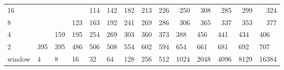 \begin{table}[h]
{\begin{tabular}{lrrrrrrrrrrrrr}
		\multicolumn{1}{|l|}{16} &  &  &  & \cellcolor[HTML]{99E600}114 & \cellcolor[HTML]{99E600}142 & \cellcolor[HTML]{99E600}182 & \cellcolor[HTML]{E69900}213 & \cellcolor[HTML]{E69900}226 & \cellcolor[HTML]{E69900}250 & \cellcolor[HTML]{E69900}308 & \cellcolor[HTML]{E69900}285 & \cellcolor[HTML]{E69900}299 & \cellcolor[HTML]{E60000}324 \\ \cline{1-1}
		\multicolumn{1}{|l|}{8} &  &  & \cellcolor[HTML]{99E600}123 & \cellcolor[HTML]{99E600}163 & \cellcolor[HTML]{E69900}192 & \cellcolor[HTML]{E69900}241 & \cellcolor[HTML]{E69900}269 & \cellcolor[HTML]{E69900}286 & \cellcolor[HTML]{E69900}306 & \cellcolor[HTML]{E60000}365 & \cellcolor[HTML]{E60000}337 & \cellcolor[HTML]{E60000}353 & \cellcolor[HTML]{E60000}377 \\ \cline{1-1}
		\multicolumn{1}{|l|}{4} & \multicolumn{1}{l}{} & \multicolumn{1}{l}{\cellcolor[HTML]{99E600}159} & \multicolumn{1}{l}{\cellcolor[HTML]{E69900}195} & \multicolumn{1}{l}{\cellcolor[HTML]{E69900}254} & \multicolumn{1}{l}{\cellcolor[HTML]{E69900}269} & \multicolumn{1}{l}{\cellcolor[HTML]{E69900}303} & \multicolumn{1}{l}{\cellcolor[HTML]{E60000}360} & \multicolumn{1}{l}{\cellcolor[HTML]{E60000}373} & \multicolumn{1}{l}{\cellcolor[HTML]{E60000}388} & \multicolumn{1}{l}{\cellcolor[HTML]{9900E6}456} & \multicolumn{1}{l}{\cellcolor[HTML]{E60000}441} & \multicolumn{1}{l}{\cellcolor[HTML]{E60000}434} & \multicolumn{1}{l}{\cellcolor[HTML]{E60000}406} \\ \cline{1-1}
		\multicolumn{1}{|l|}{2} & \multicolumn{1}{l}{\cellcolor[HTML]{E60000}395} & \multicolumn{1}{l}{\cellcolor[HTML]{E60000}395} & \multicolumn{1}{l}{\cellcolor[HTML]{9900E6}486} & \multicolumn{1}{l}{\cellcolor[HTML]{9900E6}506} & \multicolumn{1}{l}{\cellcolor[HTML]{9900E6}508} & \multicolumn{1}{l}{\cellcolor[HTML]{9900E6}554} & \multicolumn{1}{l}{\cellcolor[HTML]{4C00E6}602} & \multicolumn{1}{l}{\cellcolor[HTML]{4C00E6}594} & \multicolumn{1}{l}{\cellcolor[HTML]{4C00E6}654} & \multicolumn{1}{l}{\cellcolor[HTML]{4C00E6}661} & \multicolumn{1}{l}{\cellcolor[HTML]{4C00E6}681} & \multicolumn{1}{l}{\cellcolor[HTML]{4C00E6}692} & \multicolumn{1}{l}{\cellcolor[HTML]{4C00E6}707} \\ \hline
		\multicolumn{1}{l|}{window} & \multicolumn{1}{l|}{4} & \multicolumn{1}{l|}{8} & \multicolumn{1}{l|}{16} & \multicolumn{1}{l|}{32} & \multicolumn{1}{l|}{64} & \multicolumn{1}{l|}{128} & \multicolumn{1}{l|}{256} & \multicolumn{1}{l|}{512} & \multicolumn{1}{l|}{1024} & \multicolumn{1}{l|}{2048} & \multicolumn{1}{l|}{4096} & \multicolumn{1}{l|}{8129} & \multicolumn{1}{l|}{16384} \\ \cline{2-14} 
	\end{tabular}
}
\end{table}

